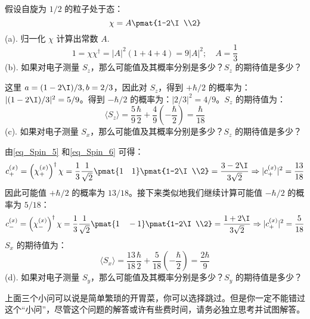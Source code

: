\begin{example}{}
假设自旋为 $1/2$ 的粒子处于态：
\begin{equation}
\chi = A\pmat{1-2\I\\2}
\end{equation}
(a). 归一化 $\chi$ 计算出常数 $A$.
\begin{equation}
1=\chi\chi^\dagger=|A|^2(1+4+4)=9|A|^2;\quad A=\frac{1}{3}
\end{equation}
(b). 如果对电子测量 $S_z$，那么可能值及其概率分别是多少？$S_z$ 的期待值是多少？

这里 $a=(1-2\I)/3,b=2/3$，因此对 $S_z$，得到 $+\hbar/2$ 的概率为：$|(1-2\I)/3|^2=5/9$。得到 $-\hbar/2$ 的概率为：$|2/3|^2=4/9$。$S_z$ 的期待值为：
\begin{equation}
\langle S_z \rangle =\frac{5}{9}\frac{\hbar}{2}+\frac{4}{9}\left(-\frac{\hbar}{2}\right)=\frac{\hbar}{18}
\end{equation}
(c). 如果对电子测量 $S_x$，那么可能值及其概率分别是多少？$S_z$ 的期待值是多少？

由\autoref{eq_Spin_5} 和\autoref{eq_Spin_6} 可得：
\begin{equation}
c_+^{(x)}=\left(\chi_+^{(x)}\right)^\dagger\chi=\frac{1}{3}\frac{1}{\sqrt{2}}\pmat{1\quad 1}\pmat{1-2\I\\2}=\frac{3-2\I}{3\sqrt{2}}\Rightarrow |c_+^{(x)}|^2=\frac{13}{18}
\end{equation}
因此可能值 $+\hbar/2$ 的概率为 $13/18$。接下来类似地我们继续计算可能值 $-\hbar/2$ 的概率为 $5/18$：
\begin{equation}
c_-^{(x)}=\left(\chi_-^{(x)}\right)^\dagger\chi=\frac{1}{3}\frac{1}{\sqrt{2}}\pmat{1\quad -1}\pmat{1-2\I\\2}=\frac{1+2\I}{3\sqrt{2}}\Rightarrow |c_+^{(x)}|^2=\frac{5}{18}
\end{equation}
$S_x$ 的期待值为：
\begin{equation}
\langle S_x \rangle =\frac{13}{18}\frac{\hbar}{2}+\frac{5}{18}\left(-\frac{\hbar}{2}\right)=\frac{2\hbar}{9}
\end{equation}
(d). 如果对电子测量 $S_y$，那么可能值及其概率分别是多少？$S_y$ 的期待值是多少？

上面三个小问可以说是简单繁琐的开胃菜，你可以选择跳过。但是你一定不能错过这个“小问”，尽管这个问题的解答或许有些费时间，请务必独立思考并试图解答。


\end{example}
